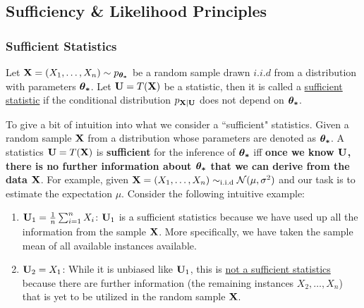 \subsection{Sufficiency \& Likelihood Principles}
\newcommand{\FacT}{\hyperref[thm:factorisation_theorem]{(\mathrm{{\bf FacT}})}}

\subsubsection{Sufficient Statistics}
\begin{definition}
    Let ${\bf X} = (X_1, \dots, X_n) \sim p_{\boldsymbol{\theta_*}}$ be a random sample drawn $i.i.d$ from a distribution with parameters $\boldsymbol{\theta_*}$. Let ${\bf U}=T({\bf X})$ be a statistic, then it is called a \underline{sufficient statistic} if the conditional distribution $p_{{\bf X}|{\bf U}}$ does not depend on $\boldsymbol{\theta_*}$.
\end{definition}

\begin{remark}
    To give a bit of intuition into what we consider a ``sufficient" statistics. Given a random sample ${\bf X}$ from a distribution whose parameters are denoted as $\boldsymbol{\theta_*}$. A statistics ${\bf U}=T({\bf X})$ is \textbf{sufficient} for the inference of $\boldsymbol{\theta_*}$ iff \textbf{once we know ${\bf U}$, there is no further information about $\boldsymbol{\theta_*}$ that we can derive from the data ${\bf X}$}. For example, given ${\bf X}=(X_1, \dots, X_n) \sim_\mathrm{i.i.d}\mathcal{N}(\mu, \sigma^2)$ and our task is to estimate the expectation $\mu$. Consider the following intuitive example:
    \begin{enumerate}[label=(\roman*)]
        \item ${\bf U}_1 = \frac{1}{n}\sum_{i=1}^n X_i$: ${\bf U}_1$ is a sufficient statistics because we have used up all the information from the sample ${\bf X}$. More specifically, we have taken the sample mean of all available instances available. 
        \item ${\bf U}_2 = X_1$: While it is unbiased like ${\bf U}_1$, this is \underline{not a sufficient statistics} because there are further information (the remaining instances $X_2, \dots, X_n$) that is yet to be utilized in the random sample ${\bf X}$.
    \end{enumerate} 
\end{remark} 

